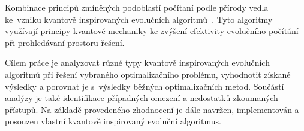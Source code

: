 Kombinace principů zmíněných podoblastí počítaní podle přírody vedla ke~vzniku kvantově inspirovaných evolučních algoritmů~\cite{QIEA-survey1,QIEA-survey2}. 
Tyto algoritmy využívají principy kvantové mechaniky ke zvýšení efektivity evolučního počítání při prohledávaní prostoru řešení. 

Cílem práce je analyzovat různé typy kvantově inspirovaných evolučních algoritmů při řešení vybraného optimalizačního problému, vyhodnotit získané výsledky a porovnat je s~výsledky běžných optimalizačních metod. 
Součástí analýzy je také identifikace případných omezení a nedostatků zkoumaných přístupů. 
Na základě provedeného zhodnocení je dále navržen, implementován a posouzen vlastní kvantově inspirovaný evoluční algoritmus. 

